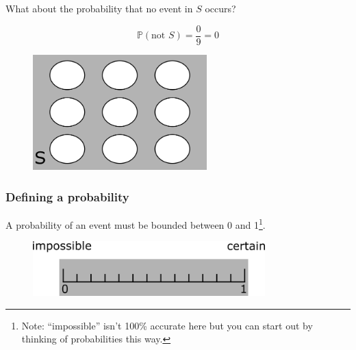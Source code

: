 \documentclass{beamer}
\begin{document}
	\begin{frame}
		What about the probability that no event in $S$ occurs?
		
		\begin{equation}
			\mathbb{P}(\text{not }S) = \frac{0}{9} = 0
		\end{equation}
		
		\begin{figure}[ht]
			\centerline{\includegraphics[width=0.6\textwidth]{./figures/pebble_world_probnots.png}}
		\end{figure}
		
	\end{frame}

	\begin{frame}
		\frametitle{Defining a probability}
		
		A probability of an event must be bounded between 0 and 1\footnote{Note: ``impossible'' isn't 100\% accurate here but you can start out by thinking of probabilities this way.}.
		
		\begin{figure}[ht]
			\centerline{\includegraphics[width=0.8\textwidth]{./figures/probability.png}}
		\end{figure}
		
	\end{frame}
\end{document}
